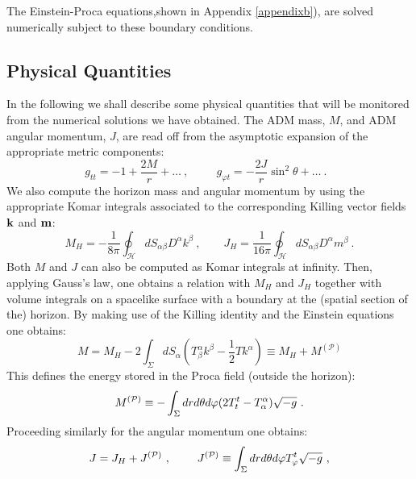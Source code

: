 The Einstein-Proca equations,shown in Appendix \ref{appendixb}), are solved numerically subject to these boundary conditions.


\subsection{Physical Quantities}
\label{subsec_II}
In the following we shall describe some physical quantities that will be monitored from the numerical solutions we have obtained.
The ADM mass, $M$, and ADM angular momentum, $J$, are read off from the asymptotic expansion of the appropriate metric components:
%
\begin{equation}
\label{Pasym}
g_{tt} =-1+\frac{2M}{r}+\dots \ ,\qquad ~~g_{\varphi t}=-\frac{2J}{r}\sin^2\theta+\dots \ . \ \ \ 
\end{equation}
%
We also compute the horizon mass and angular momentum by using the appropriate Komar integrals associated to the corresponding Killing vector fields ${\bf k}$ and ${\bf m}$:
\begin{equation}
M_H=-\frac{1}{8\pi}\oint_{\mathcal{H}}dS_{\alpha\beta}D^\alpha k^\beta \ , \qquad 
J_H=\frac{1}{16\pi}\oint_{\mathcal{H}}dS_{\alpha\beta}D^\alpha m^\beta \ .
\end{equation}
%
Both $M$ and $J$ can also be computed as Komar integrals at infinity.
Then, applying Gauss's law, one obtains a relation with $M_H$ and $J_H$ together with volume integrals on a spacelike surface with a boundary at the (spatial section of the) horizon.
By making use of the Killing identity and the Einstein equations one obtains:
\begin{equation}
M=M_H-2\int_{\Sigma}dS_{\alpha}\left(T^\alpha_\beta k^\beta-\frac{1}{2}Tk^\alpha\right) \equiv M_H+M^{(\mathcal{P})}
\end{equation}
This defines the energy stored in the Proca field (outside the horizon):
\begin{equation}
M^{({\cal P})}\equiv - \int_{\Sigma} dr d\theta d\varphi(2T_t^t-T_\alpha^\alpha) \sqrt{-g} \ .
\label{ed}
\end{equation}
%
Proceeding similarly for the angular momentum one obtains:
\begin{equation}
J=J_H+J^{(\mathcal{P})} \ , \ \qquad  J^{({\cal P})}\equiv  \int_{\Sigma} dr d\theta d\varphi T^t_\varphi \sqrt{-g} \ ,
\label{amd}
\end{equation}
